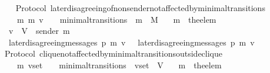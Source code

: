 \begin{isabellebody}
%
\isadelimproof
\ \ %
\endisadelimproof
%
\isatagproof
{}\isamarkupfalse%
%
\endisatagproof
{\isafoldproof}%
%
\isadelimproof
\isanewline
%
\endisadelimproof
\isanewline
\isanewline
{}\isamarkupfalse%
\ {\isacharparenleft}\ Protocol{\isacharparenright}\ later{\isacharunderscore}disagreeing{\isacharunderscore}of{\isacharunderscore}non{\isacharunderscore}sender{\isacharunderscore}not{\isacharunderscore}affected{\isacharunderscore}by{\isacharunderscore}minimal{\isacharunderscore}transitions\ {\isacharcolon}\isanewline
\ \ {\isachardoublequoteopen}{\isasymforall}\ {\isasymsigma}\ {\isasymsigma}{\isacharprime}\ m\ m{\isacharprime}\ v{\isachardot}\ {\isacharparenleft}{\isasymsigma}{\isacharcomma}\ {\isasymsigma}{\isacharprime}{\isacharparenright}\ {\isasymin}\ minimal{\isacharunderscore}transitions\ {\isasymand}\ m\ {\isasymin}\ M\isanewline
\ \ {\isasymlongrightarrow}\ m{\isacharprime}\ {\isacharequal}\ the{\isacharunderscore}elem\ {\isacharparenleft}{\isasymsigma}{\isacharprime}\ {\isacharminus}\ {\isasymsigma}{\isacharparenright}\isanewline
\ \ {\isasymlongrightarrow}\ v\ {\isasymin}\ V\ {\isacharminus}\ {\isacharbraceleft}sender\ m{\isacharprime}{\isacharbraceright}\isanewline
\ \ {\isasymlongrightarrow}\ later{\isacharunderscore}disagreeing{\isacharunderscore}messages\ {\isacharparenleft}p{\isacharcomma}\ m{\isacharcomma}\ v{\isacharcomma}\ {\isasymsigma}{\isacharparenright}\ {\isacharequal}\ later{\isacharunderscore}disagreeing{\isacharunderscore}messages\ {\isacharparenleft}p{\isacharcomma}\ m{\isacharcomma}\ v{\isacharcomma}\ {\isasymsigma}{\isacharprime}{\isacharparenright}{\isachardoublequoteclose}\isanewline
%
\isadelimproof
\ \ %
\endisadelimproof
%
\isatagproof
{}\isamarkupfalse%
%
\endisatagproof
{\isafoldproof}%
%
\isadelimproof
\isanewline
%
\endisadelimproof
\isanewline
\isanewline
\isanewline
{}\isamarkupfalse%
\ {\isacharparenleft}\ Protocol{\isacharparenright}\ clique{\isacharunderscore}not{\isacharunderscore}affected{\isacharunderscore}by{\isacharunderscore}minimal{\isacharunderscore}transitions{\isacharunderscore}outside{\isacharunderscore}clique\ {\isacharcolon}\isanewline
\ \ {\isachardoublequoteopen}{\isasymforall}\ {\isasymsigma}\ {\isasymsigma}{\isacharprime}\ m{\isacharprime}\ v{\isacharunderscore}set{\isachardot}\ {\isacharparenleft}{\isasymsigma}{\isacharcomma}\ {\isasymsigma}{\isacharprime}{\isacharparenright}\ {\isasymin}\ minimal{\isacharunderscore}transitions\ {\isasymand}\ v{\isacharunderscore}set\ {\isasymsubseteq}\ V\isanewline
\ \ {\isasymlongrightarrow}\ m{\isacharprime}\ {\isacharequal}\ the{\isacharunderscore}elem\ {\isacharparenleft}{\isasymsigma}{\isacharprime}\ {\isacharminus}\ {\isasymsigma}{\isacharparenright}\isanewline

\end{isabellebody}
